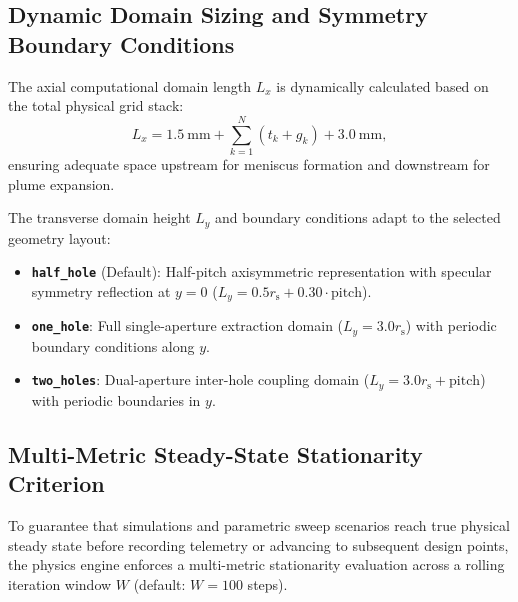 \documentclass[11pt,a4paper]{article}
\begin{document}
\subsection{Dynamic Domain Sizing and Symmetry Boundary Conditions}
The axial computational domain length $L_x$ is dynamically calculated based on the total physical grid stack:
\begin{equation}
    L_x = \SI{1.5}{\milli\meter} + \sum_{k=1}^{N} \left(t_k + g_k\right) + \SI{3.0}{\milli\meter},
\end{equation}
ensuring adequate space upstream for meniscus formation and downstream for plume expansion.

The transverse domain height $L_y$ and boundary conditions adapt to the selected geometry layout:
\begin{itemize}[nosep]
    \item \textbf{\texttt{half\_hole}} (Default): Half-pitch axisymmetric representation with specular symmetry reflection at $y = 0$ ($L_y = 0.5 r_{\mathrm{s}} + 0.30 \cdot \text{pitch}$).
    \item \textbf{\texttt{one\_hole}}: Full single-aperture extraction domain ($L_y = 3.0 r_{\mathrm{s}}$) with periodic boundary conditions along $y$.
    \item \textbf{\texttt{two\_holes}}: Dual-aperture inter-hole coupling domain ($L_y = 3.0 r_{\mathrm{s}} + \text{pitch}$) with periodic boundaries in $y$.
\end{itemize}

\subsection{Multi-Metric Steady-State Stationarity Criterion}
\label{sec:steady_state_criterion}

To guarantee that simulations and parametric sweep scenarios reach true physical steady state before recording telemetry or advancing to subsequent design points, the physics engine enforces a multi-metric stationarity evaluation across a rolling iteration window $W$ (default: $W = 100$ steps). 
\end{document}
